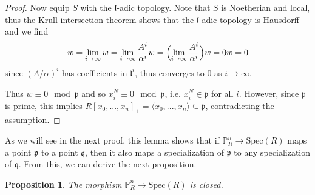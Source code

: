 \documentclass{scrartcl}
\renewcommand{\P}{\mathbb{P}}
\newcommand{\p}{\mathfrak{p}}
\newcommand{\q}{\mathfrak{q}}
\newcommand{\Spec}{\mathrm{Spec}}
\newtheorem{prop}[subsection]{Proposition}
\theoremstyle{definition}
\begin{document}
\begin{proof}
    Now equip $S$ with the $\mathfrak{l}$-adic topology.
    Note that $S$ is Noetherian and local, thus the Krull intersection theorem \cite[8.41]{comalg_notes} shows that the $\mathfrak{l}$-adic topology is Hausdorff and we find
    \begin{equation*}
        w = \lim_{i \to \infty} w = \lim_{i \to \infty} \frac {A^i} {\alpha^i} w = \Bigl( \lim_{i \to \infty} \frac {A^i} {\alpha^i} \Bigr) w = 0 w = 0
    \end{equation*}
    since $(A/\alpha)^i$ has coefficients in $\mathfrak{l}^i$, thus converges to $0$ as $i \to \infty$.

    Thus $w \equiv 0 \mod \p$ and so $x_i^N \equiv 0 \mod \p$, i.e. $x_i^N \in \p$ for all $i$.
    However, since $\p$ is prime, this implies $R[x_0, ..., x_n]_+ = \langle x_0, ..., x_n \rangle \subseteq \p$, contradicting the assumption. 
\end{proof}
As we will see in the next proof, this lemma shows that if $\P_R^n \to \Spec(R)$ maps a point $\p$ to a point $\q$, then it also maps a specialization of $\p$ to any specialization of $\q$.
From this, we can derive the next proposition.
\begin{prop}
    \label{prop:projective_structure_morphism_closed}
    The morphism $\P_R^n \to \Spec(R)$ is closed.
\end{prop}
\end{document}
